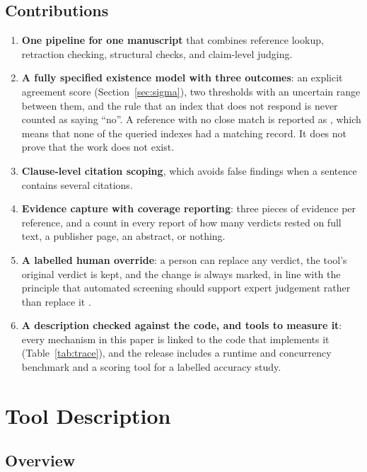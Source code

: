 \documentclass{article}
\newcommand{\vd}[1]{\texttt{\detokenize{#1}}}
\begin{document}
\subsection{Contributions}

\begin{enumerate}
\item \textbf{One pipeline for one manuscript} that combines reference lookup, retraction checking, structural checks, and claim-level judging.

\item \textbf{A fully specified existence model with three outcomes}: an explicit agreement score (Section~\ref{sec:sigma}), two thresholds with an uncertain range between them, and the rule that an index that does not respond is never counted as saying ``no''. A reference with no close match is reported as \vd{not_found}, which means that none of the queried indexes had a matching record. It does not prove that the work does not exist.

\item \textbf{Clause-level citation scoping}, which avoids false findings when a sentence contains several citations.

\item \textbf{Evidence capture with coverage reporting}: three pieces of evidence per reference, and a count in every report of how many verdicts rested on full text, a publisher page, an abstract, or nothing.

\item \textbf{A labelled human override}: a person can replace any verdict, the tool's original verdict is kept, and the change is always marked, in line with the principle that automated screening should support expert judgement rather than replace it \cite{hicks2015}.

\item \textbf{A description checked against the code, and tools to measure it}: every mechanism in this paper is linked to the code that implements it (Table~\ref{tab:trace}), and the release includes a runtime and concurrency benchmark and a scoring tool for a labelled accuracy study.
\end{enumerate}


\section{Tool Description}
\label{sec:tool}

\subsection{Overview}
\end{document}
